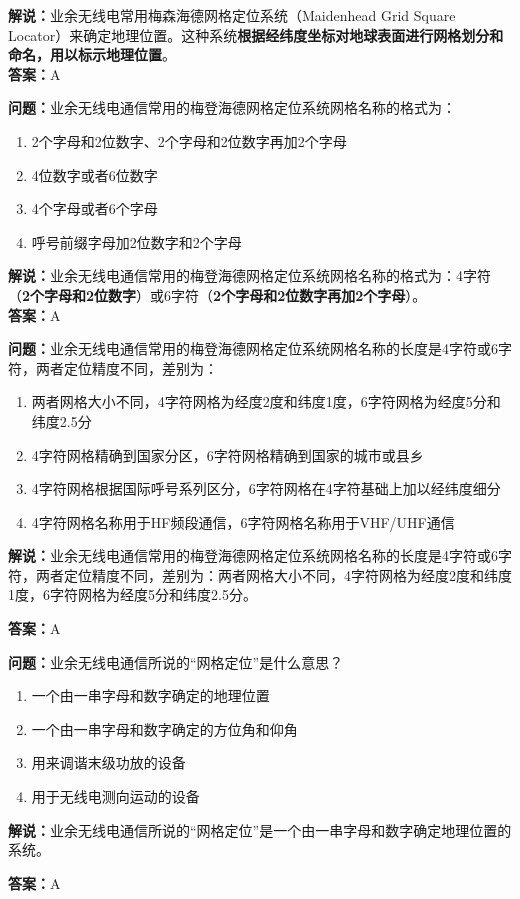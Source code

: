 \textbf{解说：}业余无线电常用梅森海德网格定位系统（Maidenhead Grid Square Locator）来确定地理位置。这种系统\textbf{根据经纬度坐标对地球表面进行网格划分和命名，用以标示地理位置}。\\\textbf{答案：}A



\textbf{问题：}业余无线电通信常用的梅登海德网格定位系统网格名称的格式为：

\begin{enumerate}[label=\Alph*), leftmargin=1.5cm]
	\item 2个字母和2位数字、2个字母和2位数字再加2个字母
	\item 4位数字或者6位数字
	\item 4个字母或者6个字母
	\item 呼号前缀字母加2位数字和2个字母
\end{enumerate}

\textbf{解说：}业余无线电通信常用的梅登海德网格定位系统网格名称的格式为：4字符（\textbf{2个字母和2位数字}）或6字符（\textbf{2个字母和2位数字再加2个字母}）。\\\textbf{答案：}A



\textbf{问题：}业余无线电通信常用的梅登海德网格定位系统网格名称的长度是4字符或6字符，两者定位精度不同，差别为：

\begin{enumerate}[label=\Alph*), leftmargin=1.5cm]
	\item 两者网格大小不同，4字符网格为经度2度和纬度1度，6字符网格为经度5分和纬度2.5分
	\item 4字符网格精确到国家分区，6字符网格精确到国家的城市或县乡
	\item 4字符网格根据国际呼号系列区分，6字符网格在4字符基础上加以经纬度细分
	\item 4字符网格名称用于HF频段通信，6字符网格名称用于VHF/UHF通信
\end{enumerate}

\textbf{解说：}业余无线电通信常用的梅登海德网格定位系统网格名称的长度是4字符或6字符，两者定位精度不同，差别为：两者网格大小不同，4字符网格为经度2度和纬度1度，6字符网格为经度5分和纬度2.5分。

\textbf{答案：}A

\textbf{问题：}业余无线电通信所说的“网格定位”是什么意思？

\begin{enumerate}[label=\Alph*), leftmargin=1.5cm]
	\item 一个由一串字母和数字确定的地理位置
	\item 一个由一串字母和数字确定的方位角和仰角
	\item 用来调谐末级功放的设备
	\item 用于无线电测向运动的设备
\end{enumerate}

\textbf{解说：}业余无线电通信所说的“网格定位”是一个由一串字母和数字确定地理位置的系统。

\textbf{答案：}A